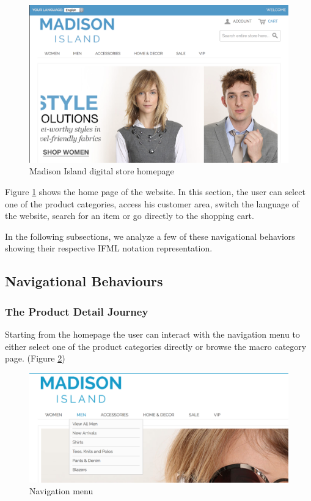 \vspace{0.1cm}
\begin{figure}[htbp]
  \centering
    \includegraphics[width=12cm]{images/home.png}
  \caption{Madison Island digital store homepage}
  \label{fig:home}
\end{figure}
\vspace{0.1cm}


Figure \ref{fig:home} shows the home page of the website. In this section, the user can select one of the product categories, access his customer area, switch the language of the website, search for an item or go directly to the shopping cart. 

In the following subsections, we analyze a few of these navigational behaviors showing their respective IFML notation representation.

\subsection{Navigational Behaviours}

\subsubsection{The Product Detail Journey}

Starting from the homepage the user can interact with the navigation menu to either select one of the product categories directly or browse the macro category page.  (Figure \ref{fig:navigation})

\vspace{0.1cm}
\begin{figure}[htbp]
  \centering
    \includegraphics[width=12cm]{images/madison/navigation.png}
  \caption{Navigation menu}
  \label{fig:navigation}
\end{figure}
\vspace{0.1cm}

